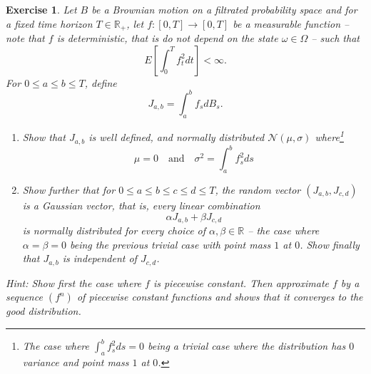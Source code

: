 \documentclass[DIV=classic,a4paper,10pt]{scrartcl}
\newtheorem{exercise}[theorem]{Exercise}
\theoremstyle{nonumberplain}
\numberwithin{equation}{section}
\begin{document}
\begin{exercise}
    Let $B$ be a Brownian motion on a filtrated probability space and for a fixed time horizon $T\in \mathbb{R}_+$, let $f:[0,T]\to [0,T]$ be a measurable function -- note that $f$ is deterministic, that is do not depend on the state $\omega \in \Omega$ -- such that
    \begin{equation*}
        E\left[ \int_{0}^T f_t^2 dt \right]<\infty.
    \end{equation*}
    For $0\leq a\leq b\leq T$, define
    \begin{equation*}
        J_{a,b}=\int_{a}^{b}f_s dB_s.
    \end{equation*}
    \begin{enumerate}[label=\alph*)]
        \item Show that $J_{a,b}$ is well defined, and normally distributed $\mathcal{N}(\mu,\sigma)$ where\footnote{The case where $\int_{a}^b f_s^2ds=0$ being a trivial case where the distribution has $0$ variance and point mass $1$ at $0$.}
            \begin{equation*}
                \mu=0\quad\text{and}\quad\sigma^2=\int_{a}^{b}f_s^2 ds
            \end{equation*}
        \item Show further that for $0\leq a\leq b\leq c\leq d\leq T$, the random vector $(J_{a,b},J_{c,d})$ is a Gaussian vector, that is, every linear combination
            \begin{equation*}
                \alpha J_{a,b}+\beta J_{c,d}
            \end{equation*}
            is normally distributed for every choice of $\alpha,\beta \in \mathbb{R}$ -- the case where $\alpha=\beta=0$ being the previous trivial case with point mass $1$ at $0$.
            Show finally that $J_{a,b}$ is independent of $J_{c,d}$.
    \end{enumerate}
    \emph{Hint:} Show first the case where $f$ is piecewise constant.
    Then approximate $f$ by a sequence $(f^n)$ of piecewise constant functions and shows that it converges to the good distribution.
\end{exercise}
\end{document}
